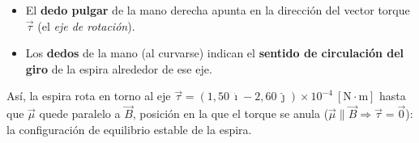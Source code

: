\documentclass[12pt,letterpaper]{article}
\begin{document}
\begin{itemize}
    \item El \textbf{dedo pulgar} de la mano derecha apunta en la direcci\'on del vector torque
          $\vec{\tau}$ (el \emph{eje de rotaci\'on}).
    \item Los \textbf{dedos} de la mano (al curvarse) indican el \textbf{sentido de circulaci\'on
          del giro} de la espira alrededor de ese eje.
\end{itemize}

\noindent As\'i, la espira rota en torno al eje
$\vec{\tau} = (1{,}50\,\hat{\imath} - 2{,}60\,\hat{\jmath})\times10^{-4}\ [\text{N}\cdot\text{m}]$
hasta que $\vec{\mu}$ quede paralelo a $\vec{B}$, posici\'on en la que el torque se anula
($\vec{\mu}\parallel\vec{B}\Rightarrow\vec{\tau}=\vec{0}$): la configuraci\'on de equilibrio
estable de la espira.
\end{document}
